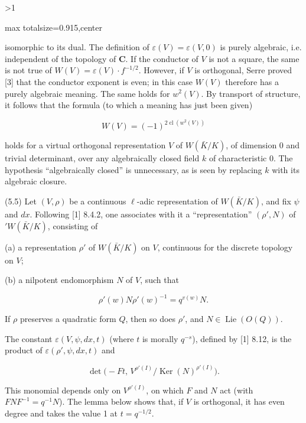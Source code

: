 \documentclass[9pt,twoside]{extarticle}
\newcommand{\EditionPage}[3]{%
  \ifnum#1>1\clearpage\fi
  \pdfbookmark[1]{Printed folio #2}{en-folio-#2}%
  \hypertarget{en-page-#1}{}%
  \noindent\begin{adjustbox}{max totalsize={\textwidth}{0.915\textheight},center}
  \begin{minipage}[t]{\textwidth}
  \fontsize{8.45}{10.05}\selectfont\justifying
  #3
  \end{minipage}
  \end{adjustbox}%
}
\begin{document}
\EditionPage{17}{315}{%
isomorphic to its dual. The definition of \(\varepsilon(V)=\varepsilon(V,0)\) is purely algebraic, i.e. independent of the topology of \(\mathbf C\). If the conductor of \(V\) is not a square, the same is not true of \(W(V)=\varepsilon(V)\cdot f^{-1/2}\). However, if \(V\) is orthogonal, Serre proved [3] that the conductor exponent is even; in this case \(W(V)\) therefore has a purely algebraic meaning. The same holds for \(w^2(V)\). By transport of structure, it follows that the formula (to which a meaning has just been given)\par

\[
\tag{5.4.1}W(V)=(-1)^{2\operatorname{cl}(w^2(V))}
\]

holds for a virtual orthogonal representation \(V\) of \(W(\bar K/K)\), of dimension 0 and trivial determinant, over any algebraically closed field \(k\) of characteristic 0. The hypothesis “algebraically closed” is unnecessary, as is seen by replacing \(k\) with its algebraic closure.\par

(5.5) Let \((V,\rho)\) be a continuous \(\ell\)-adic representation of \(W(\bar K/K)\), and fix \(\psi\) and \(dx\). Following [1] 8.4.2, one associates with it a “representation” \((\rho',N)\) of \({}'W(\bar K/K)\), consisting of\par

(a) a representation \(\rho'\) of \(W(\bar K/K)\) on \(V\), continuous for the discrete topology on \(V\);\par

(b) a nilpotent endomorphism \(N\) of \(V\), such that\par

\[
\rho'(w)N\rho'(w)^{-1}=q^{v(w)}N.
\]

If \(\rho\) preserves a quadratic form \(Q\), then so does \(\rho'\), and \(N\in\operatorname{Lie}(O(Q))\).\par

The constant \(\varepsilon(V,\psi,dx,t)\) (where \(t\) is morally \(q^{-s}\)), defined by [1] 8.12, is the product of \(\varepsilon(\rho',\psi,dx,t)\) and\par

\[
\det\bigl(-Ft,\,V^{\rho'(I)}/\operatorname{Ker}(N)^{\rho'(I)}\bigr).
\]

This monomial depends only on \(V^{\rho'(I)}\), on which \(F\) and \(N\) act (with \(FNF^{-1}=q^{-1}N\)). The lemma below shows that, if \(V\) is orthogonal, it has even degree and takes the value 1 at \(t=q^{-1/2}\).\par

}
\end{document}
